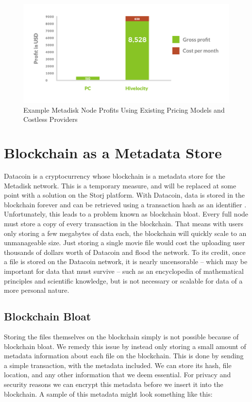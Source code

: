 \documentclass[a4paper,12pt]{article}
\begin{document}
\begin{figure}[h!]
  \centering
      \includegraphics[width=\linewidth]{05}
  \caption{Example Metadisk Node Profits Using Existing Pricing Models and Costless Providers}
\end{figure}


\section*{Blockchain as a Metadata Store}

Datacoin \cite{12} is a cryptocurrency whose blockchain is a metadata store for the Metadisk network. This is a temporary measure, and will be replaced at some point with a solution on the Storj platform.  With Datacoin, data is stored in the blockchain forever and can be retrieved using a transaction hash as an identifier \cite{12}. Unfortunately, this leads to a problem known as blockchain bloat. Every full node must store a copy of every transaction in the blockchain. That means with users only storing a few megabytes of data each, the blockchain will quickly scale to an unmanageable size. Just storing a single movie file would cost the uploading user thousands of dollars worth of Datacoin and flood the network. To its credit, once a file is stored on the Datacoin network, it is nearly uncensorable -- which may be important for data that must survive -- such as an encyclopedia of mathematical principles and scientific knowledge, but is not necessary or scalable for data of a more personal nature.

\subsection*{Blockchain Bloat}

Storing the files themselves on the blockchain simply is not possible because of blockchain bloat. We remedy this issue by instead only storing a small amount of metadata information about each file on the blockchain. This is done by sending a simple transaction, with the metadata included. We can store its hash, file location, and any other information that we deem essential. For privacy and security reasons we can encrypt this metadata before we insert it into the blockchain. A sample of this metadata might look something like this:\\
\end{document}
